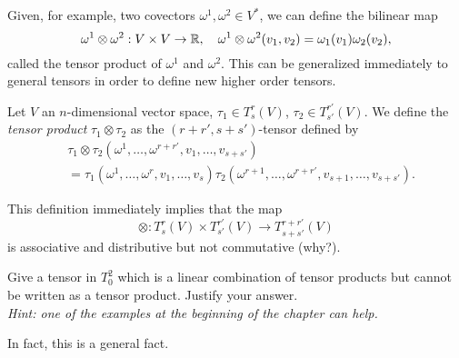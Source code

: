 Given, for example, two covectors $\omega^1, \omega^2 \in V^*$, we can define the bilinear map
\begin{equation}
  \omega^1\otimes \omega^2 : V\times V \to \mathbb{R},\quad
  \omega^1\otimes \omega^2(v_1, v_2) = \omega_1(v_1)\omega_2(v_2),
\end{equation}
called the tensor product of $\omega^1$ and $\omega^2$.
This can be generalized immediately to general tensors in order to define new higher order tensors.

\begin{definition}
  Let $V$ an $n$-dimensional vector space, $\tau_1\in T_s^r(V)$, $\tau_2\in T_{s'}^{r'}(V)$.
  We define the \emph{tensor product} $\tau_1\otimes\tau_2$ as the $(r+r', s+s')$-tensor defined by
  \begin{align}
    &\tau_1\otimes\tau_2(\omega^1,\ldots,\omega^{r+r'}, v_1,\ldots,v_{s+s'}) \\
    &= \tau_1(\omega^1,\ldots,\omega^{r}, v_1,\ldots,v_{s}) \tau_2(\omega^{r+1},\ldots,\omega^{r+r'}, v_{s+1},\ldots,v_{s+s'}).
  \end{align}
\end{definition}

This definition immediately implies that the map
\begin{equation}
  \otimes :  T_s^r(V)\times T_{s'}^{r'}(V) \to T_{s+s'}^{r+r'}(V)
\end{equation}
is associative and distributive but not commutative (why?).

\begin{exercise}
  Give a tensor in $T^2_0$ which is a linear combination of tensor products but cannot be written as a tensor product.
  Justify your answer.\\
 \textit{\small Hint: one of the examples at the beginning of the chapter can help.}
\end{exercise}

In fact, this is a general fact.

